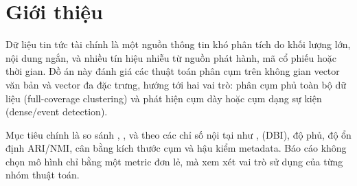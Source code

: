 \section{Giới thiệu}

Dữ liệu tin tức tài chính là một nguồn thông tin khó phân tích do khối lượng lớn, nội dung ngắn, và nhiều tín hiệu nhiễu từ nguồn phát hành, mã cổ phiếu hoặc thời gian. Đồ án này đánh giá các thuật toán phân cụm trên không gian vector văn bản và vector đa đặc trưng, hướng tới hai vai trò: phân cụm phủ toàn bộ dữ liệu (full-coverage clustering) và phát hiện cụm dày hoặc cụm dạng sự kiện (dense/event detection).

Mục tiêu chính là so sánh , ,  và  theo các chỉ số nội tại như ,  (DBI), độ phủ, độ ổn định ARI/NMI, cân bằng kích thước cụm và hậu kiểm metadata. Báo cáo không chọn mô hình chỉ bằng một metric đơn lẻ, mà xem xét vai trò sử dụng của từng nhóm thuật toán.
